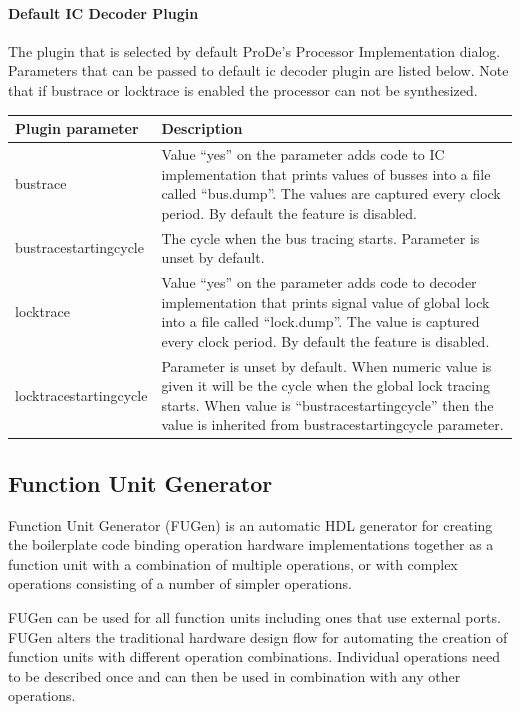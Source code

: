 \documentclass[a4paper,twoside]{tceusermanual}
\begin{document}
\paragraph{Default IC Decoder Plugin}

The plugin that is selected by default  ProDe's Processor Implementation dialog. 
Parameters that can be passed to default ic decoder plugin are listed below. Note
that if bustrace or locktrace is enabled the processor can not be synthesized.

\begin{center}
\begin{longtable}[htb]{@{}p{}@{}p{}}
\textbf{Plugin parameter} &\textbf{Description} \\
\hline
bustrace &%
Value ``yes'' on the parameter adds code to IC implementation that 
prints values of busses into a file called ``bus.dump''. The values are
captured every clock period. By default the feature is disabled.
\\
bustracestartingcycle &%
The cycle when the bus tracing starts. Parameter is unset by default.
\\
locktrace &%
Value ``yes'' on the parameter adds code to decoder implementation that 
prints signal value of global lock into a file called ``lock.dump''. The
value is captured every clock period. By default the feature is disabled.
\\
locktracestartingcycle &%
Parameter is unset by default. When numeric value is given it will be
the cycle when the global lock tracing starts. When value is 
``bustracestartingcycle'' then the value is inherited from bustracestartingcycle
parameter.
\\


\end{longtable}
\end{center}


\subsection{Function Unit Generator}

Function Unit Generator (FUGen) is an automatic HDL generator for
creating the boilerplate code binding operation hardware implementations
together as a function unit with a combination of multiple operations,
or with complex operations consisting of a number of simpler operations.

FUGen can be used for all function units including ones
that use external ports. FUGen alters the traditional hardware design
flow for automating the creation of function units with different
operation combinations. Individual operations need to be described
once and can then be used in combination with any other operations.
\end{document}
